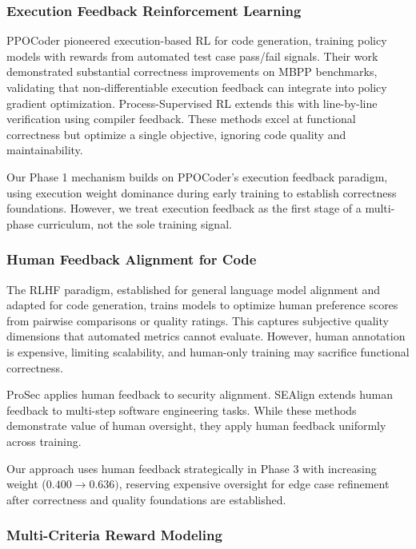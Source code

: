 
\subsubsection{Execution Feedback Reinforcement Learning}

PPOCoder \citep{ShojaeeEtAl2023PPOCoder} pioneered execution-based RL for code generation, training policy models with rewards from automated test case pass/fail signals. Their work demonstrated substantial correctness improvements on MBPP benchmarks, validating that non-differentiable execution feedback can integrate into policy gradient optimization. Process-Supervised RL \citep{YeEtAl2025ProcessSupervised} extends this with line-by-line verification using compiler feedback. These methods excel at functional correctness but optimize a single objective, ignoring code quality and maintainability.

Our Phase 1 mechanism builds on PPOCoder's execution feedback paradigm, using execution weight dominance during early training to establish correctness foundations. However, we treat execution feedback as the first stage of a multi-phase curriculum, not the sole training signal.

\subsubsection{Human Feedback Alignment for Code}

The RLHF paradigm, established for general language model alignment and adapted for code generation, trains models to optimize human preference scores from pairwise comparisons or quality ratings. This captures subjective quality dimensions that automated metrics cannot evaluate. However, human annotation is expensive, limiting scalability, and human-only training may sacrifice functional correctness.

ProSec \citep{XuEtAl2024ProSec} applies human feedback to security alignment. SEAlign \citep{ZhangEtAl2025SEAlign} extends human feedback to multi-step software engineering tasks. While these methods demonstrate value of human oversight, they apply human feedback uniformly across training.

Our approach uses human feedback strategically in Phase 3 with increasing weight (0.$400\rightarrow 0.636)$, reserving expensive oversight for edge case refinement after correctness and quality foundations are established.

\subsubsection{Multi-Criteria Reward Modeling}

